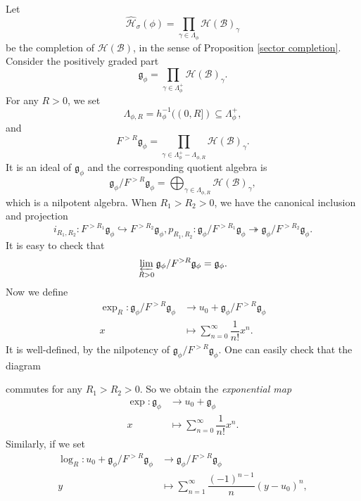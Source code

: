 \documentclass[a4paper,12pt]{amsart}
\numberwithin{equation}{section}
\newcommand{\1}{\mathbf{1}}
\begin{document}
Let
\[\hat{\mathcal{H}}_\sigma(\phi)=\prod_{\gamma\in\Lambda_\phi}\mathcal{H}(\mathcal{B})_\gamma\]
be the completion of $\mathcal{H}(\mathcal{B})$, in the sense of Proposition \ref{sector completion}. Consider the positively graded part
\[\mathfrak{g}_\phi=\prod_{\gamma\in\Lambda_\phi^+}\mathcal{H}(\mathcal{B})_\gamma.\]
For any $R>0$, we set 
\[\Lambda_{\phi,R}=h_\phi^{-1}((0,R])\subseteq\Lambda_\phi^+,\]
and
\[F^{>R}\mathfrak{g}_\phi=\prod_{\gamma\in\Lambda_\phi^+-\Lambda_{\phi,R}}\mathcal{H}(\mathcal{B})_\gamma.\]
It is an ideal of $\mathfrak{g}_\phi$ and the corresponding quotient algebra is
\[\mathfrak{g}_\phi/F^{>R}\mathfrak{g}_\phi=\bigoplus_{\gamma\in\Lambda_{\phi,R}}\mathcal{H}(\mathcal{B})_\gamma,\]
which is a nilpotent algebra. When $R_1>R_2>0$, we have the canonical inclusion and projection
\[i_{R_1,R_2}:F^{>R_1}\mathfrak{g}_\phi\hookrightarrow F^{>R_2}\mathfrak{g}_\phi,p_{R_1,R_2}:\mathfrak{g}_\phi/F^{>R_1}\mathfrak{g}_\phi\twoheadrightarrow\mathfrak{g}_\phi/F^{>R_2}\mathfrak{g}_\phi.\]
It is easy to check that
\[\varprojlim_{R>0}\mathfrak{g}_\phi/F^{>R}\mathfrak{g}_\phi=\mathfrak{g}_\phi.\]
Now we define
\begin{align*}
    \exp_R:\mathfrak{g}_\phi/F^{>R}\mathfrak{g}_\phi&\rightarrow u_0+\mathfrak{g}_\phi/F^{>R}\mathfrak{g}_\phi\\
        x&\mapsto\sum_{n=0}^\infty\dfrac{1}{n!}x^n.
\end{align*}
It is well-defined, by the nilpotency of $\mathfrak{g}_\phi/F^{>R}\mathfrak{g}_\phi$. One can easily check that the diagram
\begin{center}
\end{center}
commutes for any $R_1>R_2>0$. So we obtain the \emph{exponential map}
\begin{align*}
    \exp:\mathfrak{g}_\phi&\rightarrow u_0+\mathfrak{g}_\phi\\
    x&\mapsto\sum_{n=0}^\infty\dfrac{1}{n!}x^n.
\end{align*}
Similarly, if we set
\begin{align*}
    \log_R:u_0+\mathfrak{g}_\phi/F^{>R}\mathfrak{g}_\phi&\rightarrow \mathfrak{g}_\phi/F^{>R}\mathfrak{g}_\phi\\
        y&\mapsto\sum_{n=1}^\infty\dfrac{(-1)^{n-1}}{n}(y-u_0)^n,
\end{align*}
\end{document}
